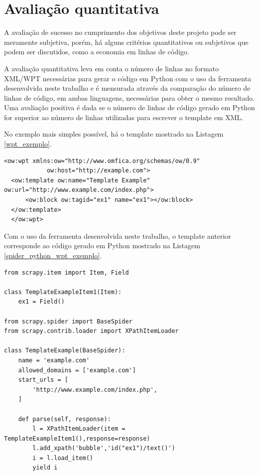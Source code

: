 \section{Avaliação quantitativa}

A avaliação de sucesso no cumprimento dos objetivos deste projeto pode ser meramente subjetiva, porém, há alguns critérios quantitativos ou subjetivos que podem ser discutidos, como a economia em linhas de código. 

A avaliação quantitativa leva em conta o número de linhas no formato XML/WPT necessárias para gerar o código em Python com o uso da ferramenta desenvolvida neste trabalho e é mensurada através da comparação do número de linhas de código, em ambas linguagens, necessárias para obter o mesmo resultado. Uma avaliação positiva é dada se o número de linhas de código gerado em Python for superior ao número de linhas utilizadas para escrever o template em XML.

No exemplo mais simples possível, há o template mostrado na Listagem \ref{wpt_exemplo}.

\begin{lstlisting}[label=wpt_exemplo]
  <ow:wpt xmlns:ow="http://www.omfica.org/schemas/ow/0.9"
            ow:host="http://example.com">
  <ow:template ow:name="Template Example" ow:url="http://www.example.com/index.php">
      <ow:block ow:tagid="ex1" name="ex1"></ow:block>
  </ow:template> 
  </ow:wpt>
\end{lstlisting}

Com o uso da ferramenta desenvolvida neste trabalho, o template anterior corresponde ao código gerado em Python mostrado na Listagem \ref{spider_python_wpt_exemplo}.

\begin{lstlisting}[label=spider_python_wpt_exemplo]
from scrapy.item import Item, Field

class TemplateExampleItem1(Item):
    ex1 = Field()

from scrapy.spider import BaseSpider
from scrapy.contrib.loader import XPathItemLoader

class TemplateExample(BaseSpider):
    name = 'example.com'
    allowed_domains = ['example.com']
    start_urls = [
        'http://www.example.com/index.php',
    ]
    
    def parse(self, response):
        l = XPathItemLoader(item = TemplateExampleItem1(),response=response)
        l.add_xpath('bubble','id("ex1")/text()') 
        i = l.load_item()
        yield i
\end{lstlisting}


